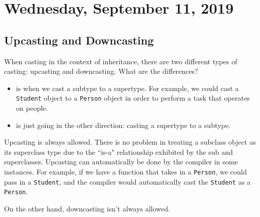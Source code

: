 \section{Wednesday, September 11, 2019}
\subsection{Upcasting and Downcasting}
When casting in the context of inheritance, there are two different types of casting: upcasting and downcasting. What are the differences?
\begin{itemize}
    \item {} is when we cast a subtype to a supertype. For example, we could cast a \verb!Student! object to a \verb!Person! object in order to perform a task that operates on people.
    \item {} is just going in the other direction: casting a supertype to a subtype.
\end{itemize}

Upcasting is always allowed. There is no problem in treating a subclass object as its superclass type due to the ``is-a" relationship exhibited by the sub and superclasses. Upcasting can automatically be done by the compiler in some instances. For example, if we have a function that takes in a \verb!Person!, we could pass in a \verb!Student!, and the compiler would automatically cast the \verb!Student! as a \verb!Person!.

On the other hand, downcasting isn't always allowed. 